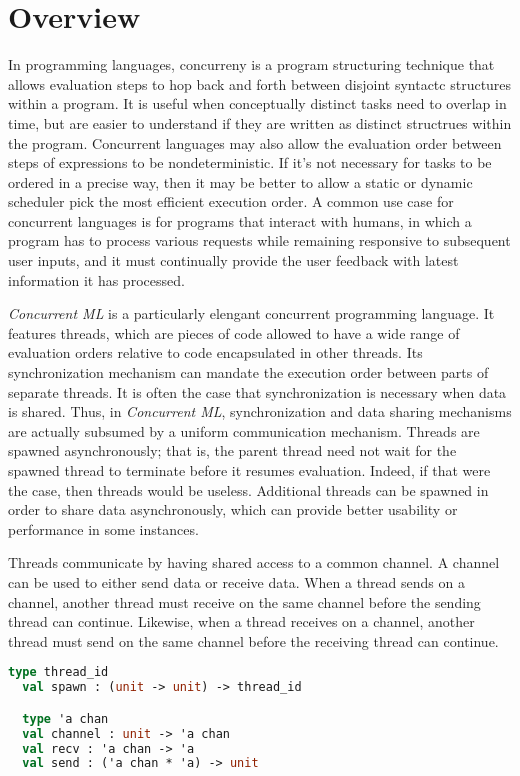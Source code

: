 \documentclass{article}
\begin{document}
\section{Overview}
In programming languages, concurreny is a program structuring technique that allows evaluation
steps to hop back and forth between disjoint syntactc structures within a program. It is useful
when conceptually distinct tasks need to overlap in time, but are easier to understand if they
are written as distinct structrues within the program. Concurrent languages may also allow the
evaluation order between steps of expressions to be nondeterministic. If it's not necessary for
tasks to be ordered in a precise way, then it may be better to allow a static or dynamic
scheduler pick the most efficient execution order. A common use case for concurrent languages
is for programs that interact with humans, in which a program has to process various requests
while remaining responsive to subsequent user inputs, and it must continually provide the user
feedback with latest information it has processed.

\textit{Concurrent ML} is a particularly elengant concurrent programming language.
It features threads, which are pieces of code allowed to have a wide range of
evaluation orders relative to code encapsulated in other threads. Its synchronization
mechanism can mandate the execution order between parts of separate threads. It is often the
case that synchronization is necessary when data is shared. Thus, in \textit{Concurrent ML},
synchronization and data sharing mechanisms are actually subsumed by a uniform communication
mechanism. Threads are spawned asynchronously; that is, the parent thread need not wait for the
spawned thread to terminate before it resumes evaluation. Indeed, if that were the case, then
threads would be useless. Additional threads can be spawned in order to share data
asynchronously, which can provide better usability or performance in some instances.


Threads communicate by having shared access to a common channel.  A channel can be used to
either send data or receive data.  When a thread sends on a channel, another thread must
receive on the same channel before the sending thread can continue.  Likewise, when a thread
receives on a channel, another thread must send on the same channel before the receiving thread
can continue.

\begin{lstlisting}[language=ML, escapechar=\%]
  type thread_id
  val spawn : (unit -> unit) -> thread_id

  type 'a chan
  val channel : unit -> 'a chan
  val recv : 'a chan -> 'a
  val send : ('a chan * 'a) -> unit
  \end{lstlisting}
\end{document}
